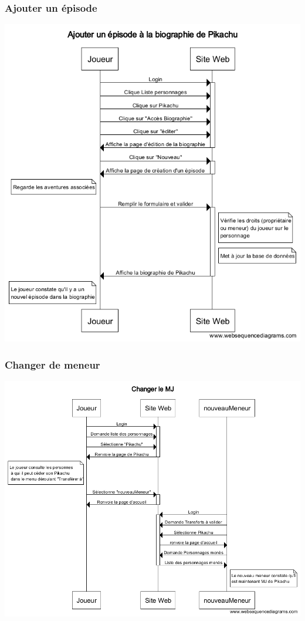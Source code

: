 \documentclass[a4paper, 11pt, titlepage]{article}
\begin{document}
\subsubsection{Ajouter un épisode}

\begin{center}
\includegraphics[scale=0.55]{sequence/AjouterEpisodeBiographie.png}
\end{center}

\subsubsection{Changer de meneur}

\begin{center}
\includegraphics[scale=0.55]{sequence/ChangerleMJ.png}
\end{center}
\end{document}
